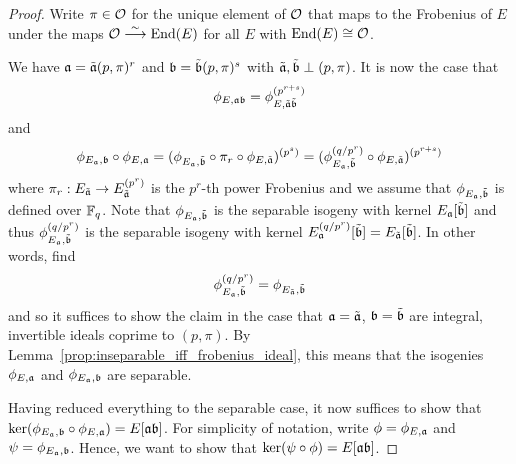 \begin{proof}
    Write $\pi \in \mathcal{O}$ for the unique element of $\mathcal{O}$ that maps to the Frobenius of $E$ under the maps $\mathcal{O} \overset{\sim}{\longrightarrow} \mathrm{End}(E)$ for all $E$ with $\mathrm{End}(E) \cong \mathcal{O}$.
    
    We have $\mathfrak{a} = \tilde{\mathfrak{a}} (p, \pi)^r$ and $\mathfrak{b} = \tilde{\mathfrak{b}} (p, \pi)^s$ with $\tilde{\mathfrak{a}}, \tilde{\mathfrak{b}} \perp (p, \pi)$.
    It is now the case that
    \begin{equation*}
        \phi_{E, \mathfrak{a}\mathfrak{b}} = \phi_{E, \tilde{\mathfrak{a}} \tilde{\mathfrak{b}}}^{(p^{r + s})}
    \end{equation*}
    and
    \begin{equation*}
        \phi_{E_{\mathfrak{a}}, \mathfrak{b}} \circ \phi_{E, \mathfrak{a}} = (\phi_{E_{\mathfrak{a}}, \tilde{\mathfrak{b}}} \circ \pi_r \circ \phi_{E, \tilde{\mathfrak{a}}})^{(p^s)} = (\phi_{E_{\mathfrak{a}}, \tilde{\mathfrak{b}}}^{(q/p^r)} \circ \phi_{E, \tilde{\mathfrak{a}}})^{(p^{r + s})}
    \end{equation*}
    where $\pi_r: E_{\tilde{\mathfrak{a}}} \to E_{\tilde{\mathfrak{a}}}^{(p^r)}$ is the $p^r$-th power Frobenius and we assume that $\phi_{E_{\mathfrak{a}}, \tilde{\mathfrak{b}}}$ is defined over $\mathbb{F}_q$.
    Note that $\phi_{E_{\mathfrak{a}}, \tilde{\mathfrak{b}}}$ is the separable isogeny with kernel $E_{\mathfrak{a}}[\tilde{\mathfrak{b}}]$ and thus $\phi_{E_{\mathfrak{a}}, \tilde{\mathfrak{b}}}^{(q/p^r)}$ is the separable isogeny with kernel $E_{\mathfrak{a}}^{(q/p^r)}[\tilde{\mathfrak{b}}] = E_{\tilde{\mathfrak{a}}}[\tilde{\mathfrak{b}}]$.
    In other words, find
    \begin{equation*}
        \phi_{E_{\mathfrak{a}}, \tilde{\mathfrak{b}}}^{(q/p^r)} = \phi_{E_{\tilde{\mathfrak{a}}}, \tilde{\mathfrak{b}}}
    \end{equation*}
    and so it suffices to show the claim in the case that $\mathfrak{a} = \tilde{\mathfrak{a}}$, $\mathfrak{b} = \tilde{\mathfrak{b}}$ are integral, invertible ideals coprime to $(p, \pi)$.
    By Lemma~\ref{prop:inseparable_iff_frobenius_ideal}, this means that the isogenies $\phi_{E, \mathfrak{a}}$ and $\phi_{E_{\mathfrak{a}}, \mathfrak{b}}$ are separable.

    Having reduced everything to the separable case, it now suffices to show that $\ker(\phi_{E_{\mathfrak{a}}, \mathfrak{b}} \circ \phi_{E, \mathfrak{a}}) = E[\mathfrak{a}\mathfrak{b}]$.
    For simplicity of notation, write $\phi = \phi_{E, \mathfrak{a}}$ and $\psi = \phi_{E_{\mathfrak{a}}, \mathfrak{b}}$.
    Hence, we want to show that $\ker(\psi \circ \phi) = E[\mathfrak{a}\mathfrak{b}]$.


\end{proof}
